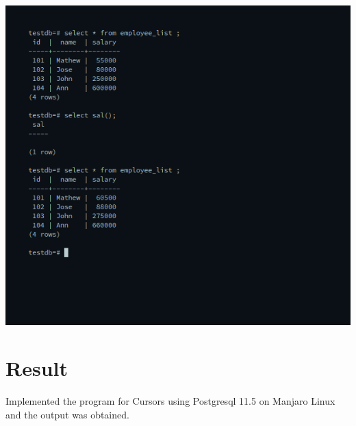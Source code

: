 \begin{enumerate}
\newline
\includegraphics[width=\linewidth]{../Images/Cursors/4.png}

\end{enumerate}

\section{Result}
Implemented the program for Cursors using Postgresql 11.5 on Manjaro Linux and the output was obtained.